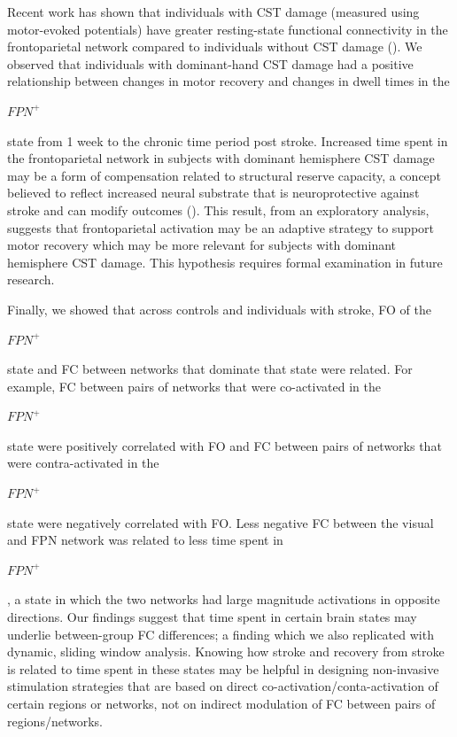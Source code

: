 \documentclass[phd,tocprelim]{cornell}
\begin{document}
    
    Recent work has shown that individuals with CST damage (measured using motor-evoked potentials) have greater resting-state functional connectivity in the frontoparietal network compared to individuals without CST damage (\cite{Hordacre2021-ct}). We observed that individuals with dominant-hand CST damage had a positive relationship between changes in motor recovery and changes in dwell times in the  \begin{Large}$FPN^+$ \end{Large} state from 1 week to the chronic time period post stroke. Increased time spent in the frontoparietal network in subjects with dominant hemisphere CST damage may be a form of compensation related to structural reserve capacity, a concept believed to reflect increased neural substrate that is neuroprotective against stroke and can modify outcomes (\cite{Rosenich2020-ef}). This result, from an exploratory analysis, suggests that frontoparietal activation may be an adaptive strategy to support motor recovery which may be more relevant for subjects with dominant hemisphere CST damage. This hypothesis requires formal examination in future research.
    
    Finally, we showed that across controls and individuals with stroke, FO of the \begin{Large}$FPN^+$\end{Large} state and FC between networks that dominate that state were related. For example, FC between pairs of networks that were co-activated in the\begin{Large} $FPN^+$\end{Large} state were positively correlated with FO and FC between pairs of networks that were contra-activated in the \begin{Large}$FPN^+$\end{Large} state were negatively correlated with FO. Less negative FC between the visual and FPN network was related to less time spent in \begin{Large}$FPN^+$\end{Large}, a state in which the two networks had large magnitude activations in opposite directions. Our findings suggest that time spent in certain brain states may underlie between-group FC differences; a finding which we also replicated with dynamic, sliding window analysis. Knowing how stroke and recovery from stroke is related to time spent in these states may be helpful in designing non-invasive stimulation strategies that are based on direct co-activation/conta-activation of certain regions or networks, not on indirect modulation of FC between pairs of regions/networks.  
\end{document}
